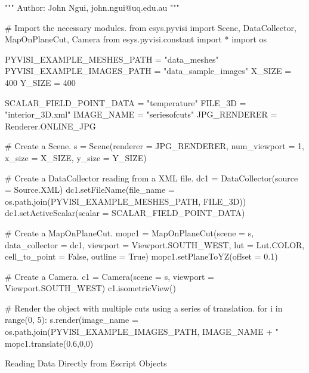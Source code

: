 \begin{python}
"""
Author: John Ngui, john.ngui@uq.edu.au
"""

# Import the necessary modules.
from esys.pyvisi import Scene, DataCollector, MapOnPlaneCut, Camera
from esys.pyvisi.constant import *
import os

PYVISI_EXAMPLE_MESHES_PATH = "data_meshes"
PYVISI_EXAMPLE_IMAGES_PATH = "data_sample_images"
X_SIZE = 400
Y_SIZE = 400

SCALAR_FIELD_POINT_DATA = "temperature"
FILE_3D = "interior_3D.xml"
IMAGE_NAME = "seriesofcuts"
JPG_RENDERER = Renderer.ONLINE_JPG

# Create a Scene.
s = Scene(renderer = JPG_RENDERER, num_viewport = 1, x_size = X_SIZE, 
        y_size = Y_SIZE)

# Create a DataCollector reading from a XML file.
dc1 = DataCollector(source = Source.XML)
dc1.setFileName(file_name = os.path.join(PYVISI_EXAMPLE_MESHES_PATH, FILE_3D))
dc1.setActiveScalar(scalar = SCALAR_FIELD_POINT_DATA)

# Create a MapOnPlaneCut.
mopc1 = MapOnPlaneCut(scene = s, data_collector = dc1, 
        viewport = Viewport.SOUTH_WEST, lut = Lut.COLOR, cell_to_point = False,
        outline = True)
mopc1.setPlaneToYZ(offset = 0.1)

# Create a Camera.
c1 = Camera(scene = s, viewport = Viewport.SOUTH_WEST)
c1.isometricView()

# Render the object with multiple cuts using a series of translation.
for i in range(0, 5):
    s.render(image_name = os.path.join(PYVISI_EXAMPLE_IMAGES_PATH, IMAGE_NAME +
			"%
    mopc1.translate(0.6,0,0)
\end{python}

\textsf{Reading Data Directly from Escript Objects}

